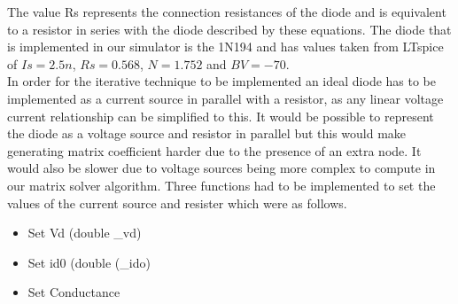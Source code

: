 \documentclass{article}
\begin{document}
The value Rs represents the connection resistances of the diode and is equivalent to a resistor in series with the diode described by these equations. The diode that is implemented in our simulator is the 1N194 and has values taken from LTspice of $Is=2.5n$, $Rs=0.568$, $N=1.752$ and $BV = -70$.  
\\
In order for the iterative technique to be implemented an ideal diode has to be implemented as a current source in parallel with a resistor, as any linear voltage current relationship can be simplified to this. It would be possible to represent the diode as a voltage source and resistor in parallel but this would make generating matrix coefficient harder due to the presence of an extra node. It would also be slower due to voltage sources being more complex to compute in our matrix solver algorithm. Three functions had to be implemented to set the values of the current source and resister which were as follows.
\begin{itemize}
    \item Set Vd (double \_vd)
    \item Set id0 (double (\_ido)
    \item Set Conductance
\end{itemize}
\end{document}
